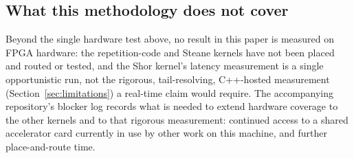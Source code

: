 \subsection{What this methodology does not cover}\label{subsec:meth-gaps}
Beyond the single hardware test above, no result in this paper is measured on FPGA hardware: the repetition-code and Steane kernels have not been placed and routed or tested, and the Shor kernel's latency measurement is a single opportunistic run, not the rigorous, tail-resolving, C++-hosted measurement (Section~\ref{sec:limitations}) a real-time claim would require. The accompanying repository's blocker log records what is needed to extend hardware coverage to the other kernels and to that rigorous measurement: continued access to a shared accelerator card currently in use by other work on this machine, and further place-and-route time.
